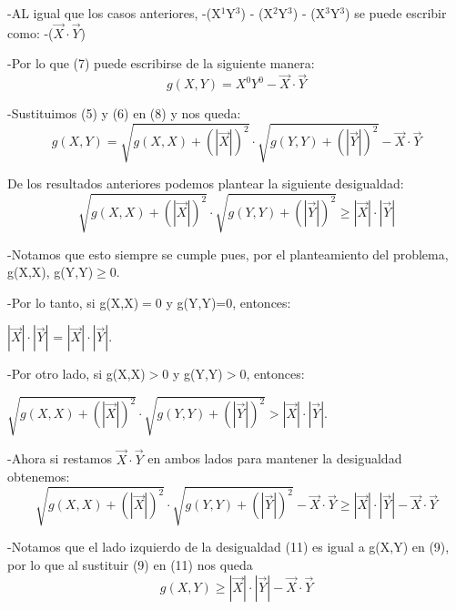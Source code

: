 \documentclass[a4paper, 11pt]{article}
\begin{document}
-AL igual que los casos anteriores, -(X$^{1}$Y$^{3}$) - (X$^{2}$Y$^{3}$) - (X$^{3}$Y$^{3}$) se puede escribir como: -($\vec{X}\cdot\vec{Y}$)

-Por lo que (7) puede escribirse de la siguiente manera:
\begin{equation}
    g(X,Y)=X^{0}Y^{0} - \vec{X}\cdot\vec{Y}
\end{equation}

-Sustituimos (5) y (6) en (8) y nos queda:
\begin{equation}
    g(X,Y)=\sqrt{g(X,X)+(|\vec{X}|)^2}\cdot\sqrt{g(Y,Y)+(|\vec{Y}|)^2} - \vec{X}\cdot\vec{Y}
\end{equation}

De los resultados anteriores podemos plantear la siguiente desigualdad:
\begin{equation}
    \sqrt{g(X,X)+(|\vec{X}|)^2}\cdot\sqrt{g(Y,Y)+(|\vec{Y}|)^2} \geq |\vec{X}| \cdot |\vec{Y}|
\end{equation}

-Notamos que esto siempre se cumple pues, por el planteamiento del problema, g(X,X), g(Y,Y)$\geq$0. 

-Por lo tanto, si g(X,X)$=$0 y g(Y,Y)=0, entonces:
\begin{center}
$|\vec{X}| \cdot |\vec{Y}|$ = $|\vec{X}| \cdot |\vec{Y}|$.
\end{center}

-Por otro lado, si g(X,X)$>$0 y g(Y,Y)$>$0, entonces:
\begin{center} 
$\sqrt{g(X,X)+(|\vec{X}|)^2}\cdot\sqrt{g(Y,Y)+(|\vec{Y}|)^2} > |\vec{X}| \cdot |\vec{Y}|$.
\end{center}

-Ahora si restamos $\vec{X}\cdot\vec{Y}$ en ambos lados para mantener la desigualdad obtenemos:
\begin{equation}
    \sqrt{g(X,X)+(|\vec{X}|)^2}\cdot\sqrt{g(Y,Y)+(|\vec{Y}|)^2} - \vec{X}\cdot\vec{Y} \geq |\vec{X}| \cdot |\vec{Y}| - \vec{X}\cdot\vec{Y}
\end{equation}

-Notamos que el lado izquierdo de la desigualdad (11) es igual a g(X,Y) en (9), por lo que al sustituir (9) en (11) nos queda 
\begin{equation}
    g(X,Y)\geq |\vec{X}| \cdot |\vec{Y}| - \vec{X}\cdot\vec{Y}
\end{equation}
\end{document}
